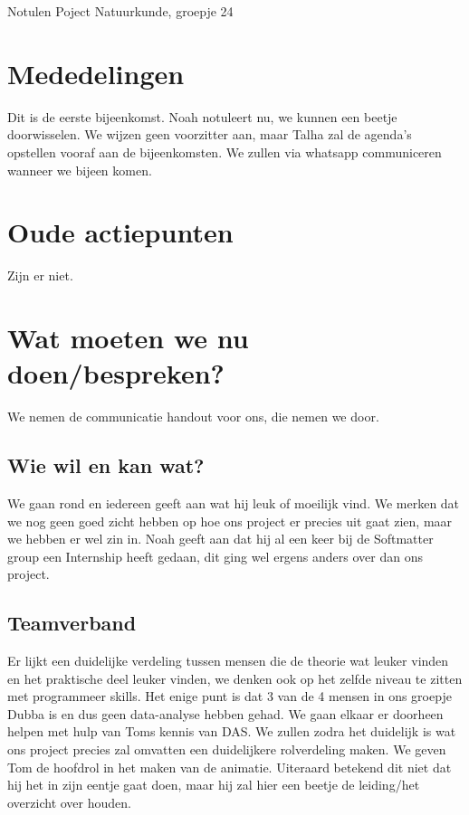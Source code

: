 \documentclass[11pt,a4paper]{article}
\begin{document}
\begin{Minutes}{Notulen Poject Natuurkunde, groepje 24}






\maketitle



\newpage


\section{Mededelingen} 
Dit is de eerste bijeenkomst. Noah notuleert nu, we kunnen een beetje doorwisselen. We wijzen geen voorzitter aan, maar Talha zal de agenda's opstellen vooraf aan de bijeenkomsten. We zullen via whatsapp communiceren wanneer we bijeen komen.

\section{Oude actiepunten}
Zijn er niet.

\section{Wat moeten we nu doen/bespreken?}
We nemen de communicatie handout voor ons, die nemen we door.

\subsection{Wie wil en kan wat?}
We gaan rond en iedereen geeft aan wat hij leuk of moeilijk vind. We merken dat we nog geen goed zicht hebben op hoe ons project er precies uit gaat zien, maar we hebben er wel zin in. Noah geeft aan dat hij al een keer bij de Softmatter group een Internship heeft gedaan, dit ging wel ergens anders over dan ons project.

\subsection{Teamverband}
Er lijkt een duidelijke verdeling tussen mensen die de theorie wat leuker vinden en het praktische deel leuker vinden, we denken ook op het zelfde niveau te zitten met programmeer skills. Het enige punt is dat 3 van de 4 mensen in ons groepje Dubba is en dus geen data-analyse hebben gehad. We gaan elkaar er doorheen helpen met hulp van Toms kennis van DAS. We zullen zodra het duidelijk is wat ons project precies zal omvatten een duidelijkere rolverdeling maken. We geven Tom de hoofdrol in het maken van de animatie. Uiteraard betekend dit niet dat hij het in zijn eentje gaat doen, maar hij zal hier een beetje de leiding/het overzicht over houden.


\end{Minutes}
\end{document}
